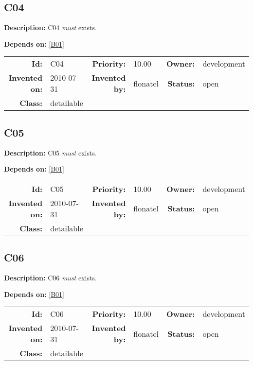 \subsection{C04}\label{C04}
\textbf{Description:} C04 \textsl{must} exists.

\textbf{Depends on:} \ref{B01} 

\par
{\small \begin{center}\begin{tabular}{rlrlrl}
\textbf{Id:} & C04  & \textbf{Priority:} & 10.00  & \textbf{Owner:} & development\\ 
\textbf{Invented on:} & 2010-07-31  & \textbf{Invented by:} & flonatel  & \textbf{Status:} & open \\ 
\textbf{Class:} & detailable  & & & \end{tabular}\end{center} }
\subsection{C05}\label{C05}
\textbf{Description:} C05 \textsl{must} exists.

\textbf{Depends on:} \ref{B01} 

\par
{\small \begin{center}\begin{tabular}{rlrlrl}
\textbf{Id:} & C05  & \textbf{Priority:} & 10.00  & \textbf{Owner:} & development\\ 
\textbf{Invented on:} & 2010-07-31  & \textbf{Invented by:} & flonatel  & \textbf{Status:} & open \\ 
\textbf{Class:} & detailable  & & & \end{tabular}\end{center} }
\subsection{C06}\label{C06}
\textbf{Description:} C06 \textsl{must} exists.

\textbf{Depends on:} \ref{B01} 

\par
{\small \begin{center}\begin{tabular}{rlrlrl}
\textbf{Id:} & C06  & \textbf{Priority:} & 10.00  & \textbf{Owner:} & development\\ 
\textbf{Invented on:} & 2010-07-31  & \textbf{Invented by:} & flonatel  & \textbf{Status:} & open \\ 
\textbf{Class:} & detailable  & & & \end{tabular}\end{center} }
